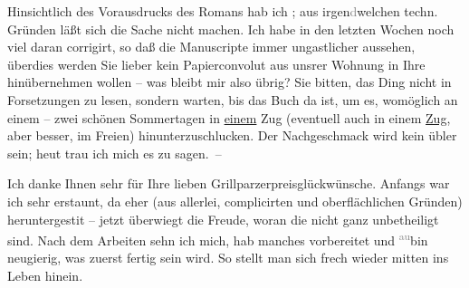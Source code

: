\pstart
           Hinsichtlich des Vorausdrucks des Romans hab ich \label{K_L03011-6v}\label{K_L03011-6}; aus irgen\textcolor{gray}{d}welchen techn. Gründen läßt sich
               die Sache nicht machen. Ich habe in den letzten Wochen noch viel daran corrigirt, so
               daß die Manuscripte immer ungastlicher aussehen, überdies werden Sie lieber kein {\pb}Papierconvolut aus unsrer Wohnung in Ihre
               hinübernehmen wollen – was bleibt mir also übrig? Sie bitten, das Ding nicht in Forsetzungen zu lesen,
               sondern warten, bis das Buch
               da ist, um es, womöglich an einem – zwei schönen Sommertagen in \uline{einem} Zug (eventuell auch in einem \uline{Zug},
               aber besser, im Freien) hinunterzuschlucken. Der Nachgeschmack wird kein übler sein;
               heut trau ich mich es zu sagen. –\pend
           
\pstart
           Ich danke Ihnen sehr für Ihre lieben Grillparzerpreisglückwünsche. Anfangs war ich sehr erstaunt, da{\geminationn} eher (aus allerlei, complicirten und oberflächlichen
               Gründen) heruntergesti{\geminationm}t – jetzt überwiegt die Freude,
               woran die {\pb}\label{K_L03011-7v}\label{K_L03011-7} nicht ganz unbetheiligt sind. Nach dem Arbeiten sehn ich mich,
               hab manches vorbereitet und \substVorne{}\textsuperscript{\textcolor{gray}{au}}\substDazwischen{}bin\substHinten{} neugierig, was zuerst fertig sein wird. So stellt man sich frech wieder
               mitten ins Leben hinein.\pend
           
